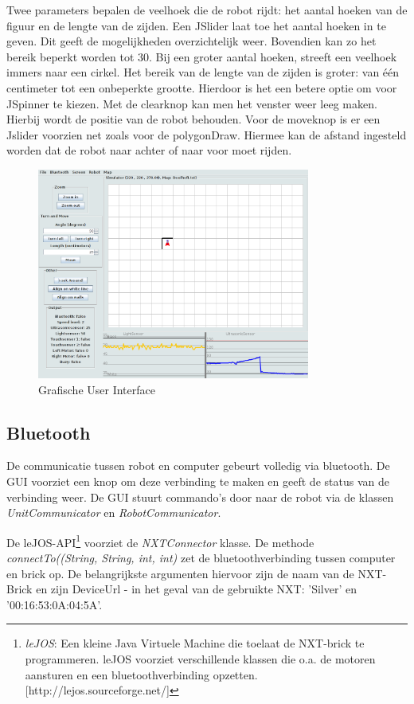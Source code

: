 \documentclass[tt3]{penoverslag}
\begin{document}
Twee parameters bepalen de veelhoek die de robot rijdt: het aantal hoeken van de figuur en de lengte van de zijden.
Een JSlider laat toe het aantal hoeken in te geven. Dit geeft de mogelijkheden overzichtelijk weer. Bovendien kan zo het bereik beperkt worden tot 30. Bij een groter aantal hoeken, streeft een veelhoek immers naar een cirkel.
Het bereik van de lengte van de zijden is groter: van \'e\'en centimeter tot een onbeperkte grootte. Hierdoor is het een betere optie om voor JSpinner te kiezen. Met de clearknop kan men het venster weer leeg maken. Hierbij wordt de positie van de robot behouden.
Voor de moveknop is er een Jslider voorzien net zoals voor de polygonDraw. Hiermee kan de afstand ingesteld worden dat de robot naar achter of naar voor moet rijden.

\begin{figure}[tbp]
\begin{center}
    \includegraphics[width=0.8\textwidth]{GUI}
    \caption{Grafische User Interface}
	\label{fig:gui}
\end{center}
\end{figure}

\subsection{Bluetooth} %
\label{ssec:bluetooth}
De communicatie tussen robot en computer gebeurt volledig via bluetooth. De GUI voorziet een knop om deze verbinding te maken en geeft de status van de verbinding weer. De GUI stuurt commando's door naar de robot via de klassen \textit{UnitCommunicator} en \textit{RobotCommunicator}.

De leJOS-API\footnote{\textit{leJOS}:  Een kleine Java Virtuele Machine die toelaat de NXT-brick te programmeren. leJOS voorziet verschillende klassen die o.a. de motoren aansturen en een bluetoothverbinding opzetten.  \mbox{[http://lejos.sourceforge.net/]}} voorziet de \textit{NXTConnector} klasse. De methode \textit{connectTo((String, String, int, int)} zet de bluetoothverbinding tussen computer en brick op. De belangrijkste argumenten hiervoor zijn de naam van de NXT-Brick en zijn DeviceUrl  - in het geval van de gebruikte NXT: 'Silver' en '00:16:53:0A:04:5A'.
\end{document}
